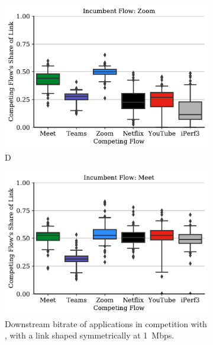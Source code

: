 \begin{figure}[t!]
\centering
\begin{subfigure}[t]{.33\textwidth}
    \centering
    \includegraphics[width=1\textwidth]{figures/comp/box_plot_zoom_dl_1.0.pdf}
    \caption{D}
    \label{fig:zoom_box_1}
\end{subfigure}\hfill
\begin{subfigure}[t]{.33\textwidth}
    \centering
    \includegraphics[width=1\textwidth]{figures/comp/box_plot_meet_dl_1.0.pdf}
    \caption{Downstream bitrate of applications in competition with , with a link shaped symmetrically at 1~Mbps.}
    \label{fig:zoom_box_1}
\end{subfigure}
\begin{subfigure}[t]{.33\textwidth}
    \centering

\end{subfigure}
\end{figure}
